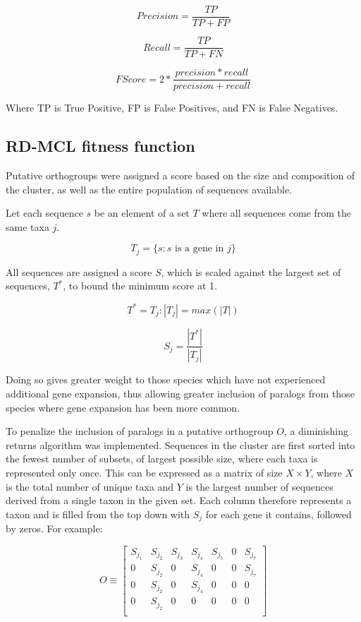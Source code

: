 \documentclass[twocolumn]{bmcart}%
\begin{document}
$$
Precision = \frac{TP}{TP + FP}
$$

$$
Recall = \frac{TP}{TP + FN}
$$

$$
F Score = 2 * \frac{precision * recall}{precision + recall}
$$

Where TP is True Positive, FP is False Positives, and FN is False Negatives.

\subsection{RD-MCL fitness function}
Putative orthogroups were assigned a score based on the size and composition of the cluster, as well as the entire population of sequences available.

Let each sequence $s$ be an element of a set $T$ where all sequences come from the same taxa $j$.

$$
T_j = \{s:s \text{ is a gene in } j\}
$$

All sequences are assigned a score $S$, which is scaled against the largest set of sequences, $T^*$, to bound the minimum score at 1.

$$
T^* = T_j:|T_j| = max(|T|)
$$

$$
S_j = \frac{|T^*|}{|T_j|}
$$

Doing so gives greater weight to those species which have not experienced additional gene expansion, thus allowing greater inclusion of paralogs from those species where gene expansion has been more common.

To penalize the inclusion of paralogs in a putative orthogroup $O$, a diminishing returns algorithm was implemented. Sequences in the cluster are first sorted into the fewest number of subsets, of largest possible size, where each taxa is represented only once. This can be expressed as a matrix of size $X \times Y$, where $X$ is the total number of unique taxa and $Y$ is the largest number of sequences derived from a single taxon in the given set. Each column therefore represents a taxon and is filled from the top down with $S_j$ for each gene it contains, followed by zeros. For example:


$$
O \equiv
\begin{bmatrix}
    S_{j_1} & S_{j_2} & S_{j_3} & S_{j_4} & S_{j_5} & 0 & S_{j_7}\\
    0 & S_{j_2} & 0 & S_{j_4} & 0 & 0 & S_{j_7} \\
    0 & S_{j_2} & 0 & S_{j_4} & 0 & 0 & 0 \\
    0 & S_{j_2} & 0 & 0 & 0 & 0 & 0 \\
\end{bmatrix}
$$
\end{document}
